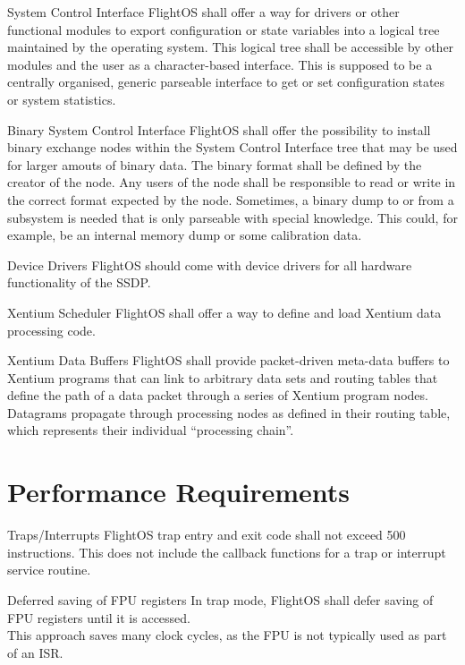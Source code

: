  {System Control Interface}{%
FlightOS shall offer a way for drivers or other functional modules to export
configuration or state variables into a logical tree maintained by
the operating system. This logical tree shall be accessible by other modules and
the user as a character-based interface.
}{%
This is supposed to be a centrally organised, generic parseable interface to
get or set configuration states or system statistics.
}%

 {Binary System Control Interface}{%
FlightOS shall offer the possibility to install binary exchange nodes within the
System Control Interface tree that may be used for larger amouts of binary data.
The binary format shall be defined by the creator of the node. Any users of the
node shall be responsible to read or write in the correct format expected by the
node.%
}{%
Sometimes, a binary dump to or from a subsystem is needed that is only parseable
with special knowledge. This could, for example, be an internal memory dump or
some calibration data.
}%

 {Device Drivers}{%
FlightOS should come with device drivers for all hardware functionality of the SSDP.
}{}%

 {Xentium Scheduler}{%
FlightOS shall offer a way to define and load Xentium data processing code.
}{}%

 {Xentium Data Buffers}{%
FlightOS shall provide packet-driven meta-data buffers to Xentium programs that
can link to arbitrary data sets and routing tables that define the path of
a data packet through a series of Xentium program nodes.
}{%
Datagrams propagate through processing nodes as defined in their routing table,
which represents their individual ``processing chain''.}%


\section{Performance Requirements}

 {Traps/Interrupts}{%
FlightOS trap entry and exit code shall not exceed 500 instructions.
}{%
This does not include the callback functions for a trap or interrupt
service routine.
}%

 {Deferred saving of \gls{FPU} registers}{%
In trap mode, FlightOS shall defer saving of \gls{FPU} registers until it is
accessed.\\


}{%
This approach saves many clock cycles, as the \gls{FPU} is not typically used
as part of an \gls{ISR}.
}%


